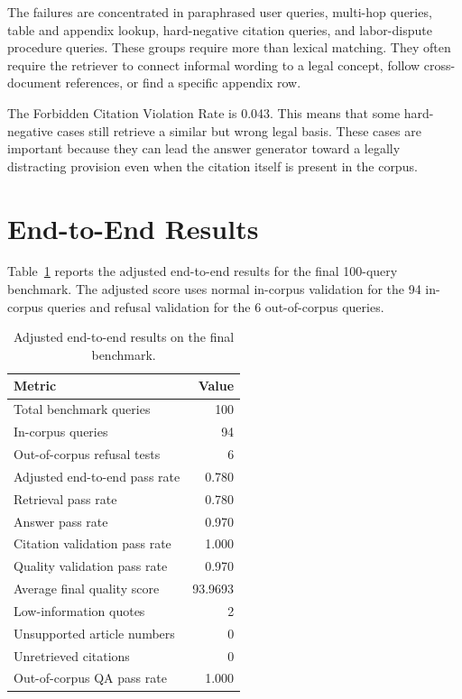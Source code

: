 The failures are concentrated in paraphrased user queries, multi-hop queries, table and appendix lookup, hard-negative citation queries, and labor-dispute procedure queries. These groups require more than lexical matching. They often require the retriever to connect informal wording to a legal concept, follow cross-document references, or find a specific appendix row.

The Forbidden Citation Violation Rate is 0.043. This means that some hard-negative cases still retrieve a similar but wrong legal basis. These cases are important because they can lead the answer generator toward a legally distracting provision even when the citation itself is present in the corpus.

\section{End-to-End Results}
\label{sec:end-to-end-results}

Table~\ref{tab:end-to-end-results-100} reports the adjusted end-to-end results for the final 100-query benchmark. The adjusted score uses normal in-corpus validation for the 94 in-corpus queries and refusal validation for the 6 out-of-corpus queries.

\begin{table}[H]
  \centering
  \caption{Adjusted end-to-end results on the final benchmark.}
  \label{tab:end-to-end-results-100}
  \begin{tabular}{lr}
    \toprule
    Metric & Value \\
    \midrule
    Total benchmark queries & 100 \\
    In-corpus queries & 94 \\
    Out-of-corpus refusal tests & 6 \\
    Adjusted end-to-end pass rate & 0.780 \\
    Retrieval pass rate & 0.780 \\
    Answer pass rate & 0.970 \\
    Citation validation pass rate & 1.000 \\
    Quality validation pass rate & 0.970 \\
    Average final quality score & 93.9693 \\
    Low-information quotes & 2 \\
    Unsupported article numbers & 0 \\
    Unretrieved citations & 0 \\
    Out-of-corpus QA pass rate & 1.000 \\
    \bottomrule
  \end{tabular}
\end{table}

